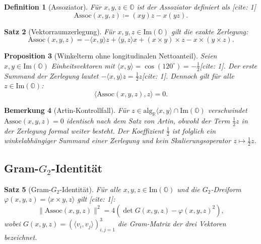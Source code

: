\documentclass[11pt,a4paper]{article}
\newtheorem{theorem}{Satz}[section]
\newtheorem{proposition}[theorem]{Proposition}
\newtheorem{definition}[theorem]{Definition}
\newtheorem{remark}[theorem]{Bemerkung}
\newcommand{\Oalg}{\mathbb{O}}
\newcommand{\ImO}{\mathrm{Im}(\mathbb{O})}
\newcommand{\Assoc}{\mathrm{Assoc}}
\begin{document}
	\begin{definition}[Assoziator]
		Für $x,y,z \in \Oalg$ ist der Assoziator definiert als \cite{schafer}[cite: 1]
		\begin{equation}
			\Assoc(x,y,z) \coloneqq (xy)z - x(yz).
		\end{equation}
	\end{definition}
	
	\begin{theorem}[Vektorraumzerlegung]
		Für $x,y,z \in \ImO$ gilt die exakte Zerlegung:
		\begin{equation}
			\Assoc(x,y,z) = -\langle x,y\rangle z + \langle y,z\rangle x + (x\times y)\times z - x\times(y\times z).
		\end{equation}
	\end{theorem}
	
	\begin{proposition}[Winkelterm ohne longitudinalen Nettoanteil]
		Seien $x,y \in \ImO$ Einheitsvektoren mit $\langle x,y\rangle = \cos(120^\circ) = -\frac{1}{2}$[cite: 1]. Der erste Summand der Zerlegung lautet $-\langle x,y\rangle z = \frac{1}{2}z$[cite: 1]. Dennoch gilt für alle $z \in \ImO$:
		\begin{equation}
			\langle \Assoc(x,y,z), z\rangle = 0.
		\end{equation}
	\end{proposition}
	
	\begin{remark}[Artin-Kontrollfall]
		Für $z \in \mathrm{alg}_{\mathbb{R}}\langle x,y\rangle \cap \ImO$ verschwindet $\Assoc(x,y,z) = 0$ identisch nach dem Satz von Artin, obwohl der Term $\frac{1}{2}z$ in der Zerlegung formal weiter besteht. Der Koeffizient $\frac{1}{2}$ ist folglich ein winkelabhängiger Summand einer Zerlegung und kein Skalierungsoperator $z \mapsto \frac{1}{2}z$.
	\end{remark}
	
	\subsection{Gram-$G_2$-Identität}
	
	\begin{theorem}[Gram-$G_2$-Identität]
		Für alle $x,y,z \in \ImO$ und die $G_2$-Dreiform $\varphi(x,y,z) = \langle x\times y, z\rangle$ gilt \cite{harvey}[cite: 1]:
		\begin{equation}
			\|\Assoc(x,y,z)\|^2 = 4 \left( \det G(x,y,z) - \varphi(x,y,z)^2 \right),
		\end{equation}
		wobei $G(x,y,z) = (\langle v_i, v_j\rangle)_{i,j=1}^3$ die Gram-Matrix der drei Vektoren bezeichnet.
	\end{theorem}
	
\end{document}
